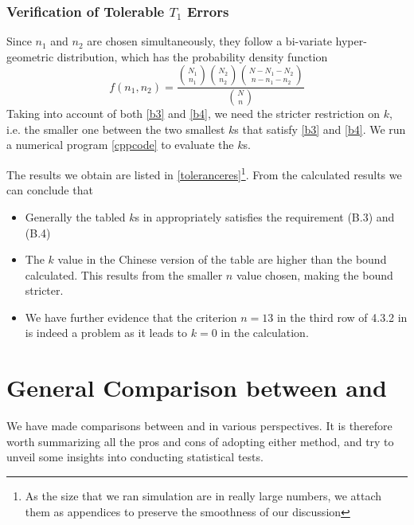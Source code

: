 \documentclass[12pt]{article}
\begin{document}
\subsubsection{Verification of Tolerable $T_1$ Errors}

Since $n_1$ and $n_2$ are chosen simultaneously, they follow a bi-variate hyper-geometric distribution, which has the probability density function
$$
f(n_1, n_2) = \dfrac{\binom{N_1}{n_1}\binom{N_2}{n_2}\binom{N-N_1-N_2}{n-n_1-n_2}}{\binom{N}{n}}
$$
Taking into account of both \eqref{b3} and \eqref{b4}, we need the stricter restriction on $k$, i.e. the smaller one between the two smallest $k$s that satisfy \eqref{b3} and \eqref{b4}. We run a numerical program \ref{cppcode} to evaluate the $k$s. 

The results we obtain are listed in \ref{toleranceres}\footnote{As the size that we ran simulation are in really large numbers, we attach them as appendices to preserve the smoothness of our discussion}. From the calculated results we can conclude that

\begin{itemize}
    \item Generally the tabled $k$s in \cite{OIML2016} appropriately satisfies the requirement (B.3) and (B.4) 
    \item The $k$ value in the Chinese version of the table are higher than the bound calculated. This results from the smaller $n$ value chosen, making the bound stricter.
    \item We have further evidence that the criterion $n=13$ in the third row of 4.3.2 in \cite{JJF2005} is indeed a problem as it leads to $k = 0$ in the calculation.
\end{itemize}

\section{General Comparison between \cite{JJF2005} and \cite{OIML2016}}

We have made comparisons between \cite{JJF2005} and \cite{OIML2016} in various perspectives. It is therefore worth summarizing all the pros and cons of adopting either method, and try to unveil some insights into conducting statistical tests.
\end{document}
